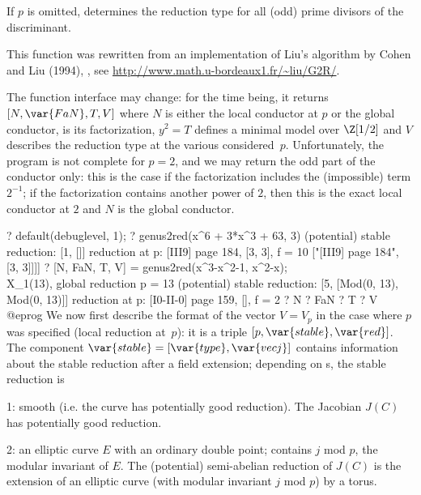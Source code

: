 If $p$ is omitted, determines the reduction type for all (odd) prime
divisors of the discriminant.

\noindent This function was rewritten from an implementation of Liu's
algorithm by Cohen and Liu (1994), , see
\url{http://www.math.u-bordeaux1.fr/~liu/G2R/}.

 The function interface may change: for the
time being, it returns $[N,\var{FaN}, T, V]$
where $N$ is either the local conductor at $p$ or the
global conductor,  is its factorization, $y^2 = T$ defines a
minimal model over $\Z[1/2]$ and $V$ describes the reduction type at the
various considered~$p$. Unfortunately, the program is not complete for
$p = 2$, and we may return the odd part of the conductor only: this is the
case if the factorization includes the (impossible) term $2^{-1}$; if the
factorization contains another power of $2$, then this is the exact local
conductor at $2$ and $N$ is the global conductor.

\bprog
? default(debuglevel, 1);
? genus2red(x^6 + 3*x^3 + 63, 3)
(potential) stable reduction: [1, []]
reduction at p: [III{9}] page 184, [3, 3], f = 10
       ["[III{9}] page 184", [3, 3]]]]
? [N, FaN, T, V] = genus2red(x^3-x^2-1, x^2-x);  \\ X_1(13), global reduction
p = 13
(potential) stable reduction: [5, [Mod(0, 13), Mod(0, 13)]]
reduction at p: [I{0}-II-0] page 159, [], f = 2
? N
? FaN
? T
? V
@eprog\noindent
We now first describe the format of the vector $V = V_p$ in the case where
$p$ was specified (local reduction at~$p$): it is a triple $[p, \var{stable},
\var{red}]$. The component $\var{stable} = [\var{type}, \var{vecj}]$ contains
information about the stable reduction after a field extension;
depending on s, the stable reduction is

\item 1: smooth (i.e. the curve has potentially good reduction). The
      Jacobian $J(C)$ has potentially good reduction.

\item 2: an elliptic curve $E$ with an ordinary double point; 
contains $j$ mod $p$, the modular invariant of $E$. The (potential)
semi-abelian reduction of $J(C)$ is the extension of an elliptic curve (with
modular invariant $j$ mod $p$) by a torus.

